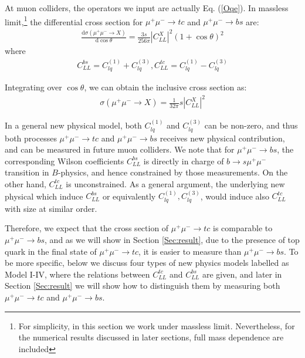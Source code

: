 \documentclass[a4paper,11pt]{article}
\newcommand{\ud}{\mathrm{d}}
\begin{document}
At muon colliders, the operators we input are actually Eq. (\ref{Oqe}).
 In massless limit,\footnote{For simplicity, in this section we work under massless limit. Nevertheless, for the numerical results discussed in later sections, full mass dependence are included} the differential cross section for $\mu^+\mu^-\to tc$ and  $\mu^+\mu^-\to bs$ are:
 \begin{align}
     \frac{\ud\sigma(\mu^+\mu^-\to X)}{\ud\cos\theta}=\frac{3s}{256\pi}|C_{LL}^{X}|^2(1+\cos\theta)^2
 \end{align}
 where
 \begin{align}
 C_{LL}^{bs}=C_{lq}^{(1)}+C_{lq}^{(3)},C_{LL}^{tc}=C_{lq}^{(1)}-C_{lq}^{(3)}
 \end{align}

Integrating over $\cos\theta$, we can obtain the inclusive cross section as:
\begin{align}
    \sigma(\mu^+\mu^-\to X)=\frac{1}{32\pi}s|C_{LL}^{X}|^2
\end{align}

In a general new physical model,
both $C_{lq}^{(1)}$ and $C_{lq}^{(3)}$ can be non-zero,
and thus both processes $\mu^+\mu^-\to tc$ and $\mu^+\mu^-\to bs$ receives new physical contribution,
and can be measured in future muon colliders.
We note that for $\mu^+\mu^-\to bs$, the corresponding Wilson coefficients $C_{LL}^{bs}$ is directly in charge of $b\to s\mu^+\mu^-$ transition in $B$-physics,
and hence constrained by those measurements.
On the other hand, $C_{LL}^{tc}$ is unconstrained.
As a general argument, the underlying new physical which induce $C_{LL}^{bs}$ or equivalently $C_{lq}^{(1)},C_{lq}^{(3)}$,
would induce also $C_{LL}^{tc}$ with size at similar order.

Therefore, we expect that the cross section of $\mu^+\mu^-\to tc$ is comparable to $\mu^+\mu^-\to bs$,
and as we will show in Section \ref{Sec:result}, due to the presence of top quark in the final state of $\mu^+\mu^-\to tc$,
it is easier to measure than $\mu^+\mu^-\to bs$.
To be more specific, below we discuss four types of new physics models labelled as Model I-IV, 
where the relations between $C_{LL}^{tc}$ and $C_{LL}^{bs}$ are given,
and later in Section \ref{Sec:result} we will show how to distinguish them by measuring both $\mu^+\mu^-\to tc$ and $\mu^+\mu^-\to bs$.
\end{document}
